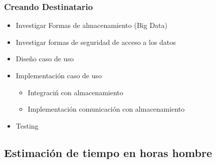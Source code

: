 \documentclass[a4paper, 11pt]{article}
\begin{document}
\subsubsection{Creando Destinatario}
\begin{itemize}
\item Investigar Formas de almacenamiento (Big Data)
\item Investigar formas de seguridad de acceso a los datos
\item Dise\~no caso de uso
\item Implementaci\'on caso de uso
\begin{itemize}
\item Integraci\'n con almacenamiento
\item Implementaci\'on comunicaci\'on con almacenamiento
\end{itemize}
\item Testing
\end{itemize}
\subsection{Estimaci\'on de tiempo en horas hombre}

\end{document}
